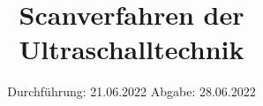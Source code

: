 

\subject{US2}
\title{Scanverfahren der Ultraschalltechnik}
\date{%
  Durchführung: 21.06.2022
  \hspace{3em}
  Abgabe: 28.06.2022
}



\maketitle
\thispagestyle{empty}
\tableofcontents
\newpage








